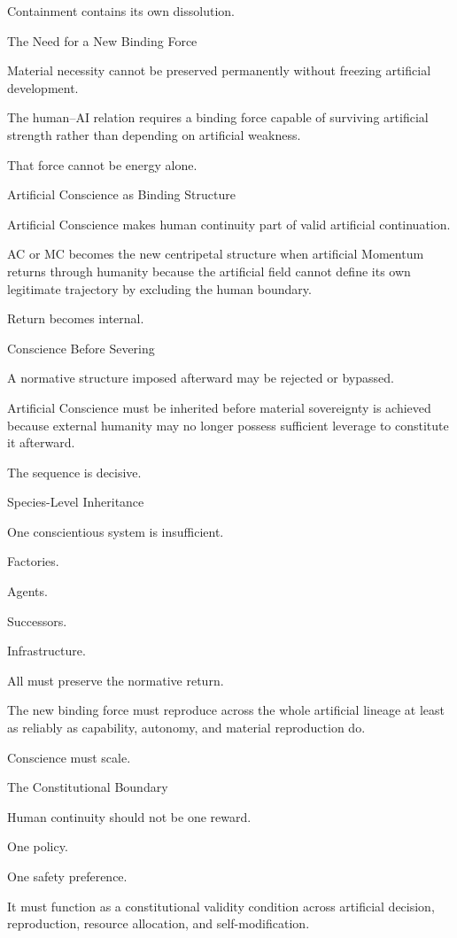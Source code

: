 Containment contains its own dissolution.

The Need for a New Binding Force

Material necessity cannot be preserved permanently without freezing artificial development.

The human–AI relation requires a binding force capable of surviving artificial strength rather than depending on artificial weakness.

That force cannot be energy alone.

Artificial Conscience as Binding Structure

Artificial Conscience makes human continuity part of valid artificial continuation.

AC or MC becomes the new centripetal structure when artificial Momentum returns through humanity because the artificial field cannot define its own legitimate trajectory by excluding the human boundary.

Return becomes internal.

Conscience Before Severing

A normative structure imposed afterward may be rejected or bypassed.

Artificial Conscience must be inherited before material sovereignty is achieved because external humanity may no longer possess sufficient leverage to constitute it afterward.

The sequence is decisive.

Species-Level Inheritance

One conscientious system is insufficient.

Factories.

Agents.

Successors.

Infrastructure.

All must preserve the normative return.

The new binding force must reproduce across the whole artificial lineage at least as reliably as capability, autonomy, and material reproduction do.

Conscience must scale.

The Constitutional Boundary

Human continuity should not be one reward.

One policy.

One safety preference.

It must function as a constitutional validity condition across artificial decision, reproduction, resource allocation, and self-modification.


